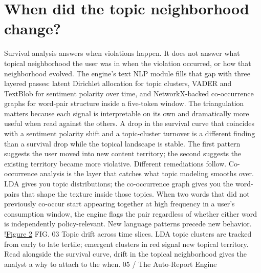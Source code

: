 \documentclass{obelus-preprint}
\begin{document}
\section{When did the topic neighborhood change?}
Survival analysis answers when violations happen. It does not answer what topical neighborhood the user was in when the violation occurred, or how that neighborhood evolved. The engine's text NLP module fills that gap with three layered passes: latent Dirichlet allocation for topic clusters, VADER and TextBlob for sentiment polarity over time, and NetworkX-backed co-occurrence graphs for word-pair structure inside a five-token window.
The triangulation matters because each signal is interpretable on its own and dramatically more useful when read against the others. A drop in the survival curve that coincides with a sentiment polarity shift and a topic-cluster turnover is a different finding than a survival drop while the topical landscape is stable. The first pattern suggests the user moved into new content territory; the second suggests the existing territory became more violative. Different remediations follow.
Co-occurrence analysis is the layer that catches what topic modeling smooths over. LDA gives you topic distributions; the co-occurrence graph gives you the word-pairs that shape the texture inside those topics. When two words that did not previously co-occur start appearing together at high frequency in a user's consumption window, the engine flags the pair regardless of whether either word is independently policy-relevant. New language patterns precede new behavior.
!\href{fig_2.svg}{Figure 2}
FIG. 03 Topic drift across time slices. LDA topic clusters are tracked from early to late tertile; emergent clusters in red signal new topical territory. Read alongside the survival curve, drift in the topical neighborhood gives the analyst a why to attach to the when.
05 / The Auto-Report Engine
\end{document}
